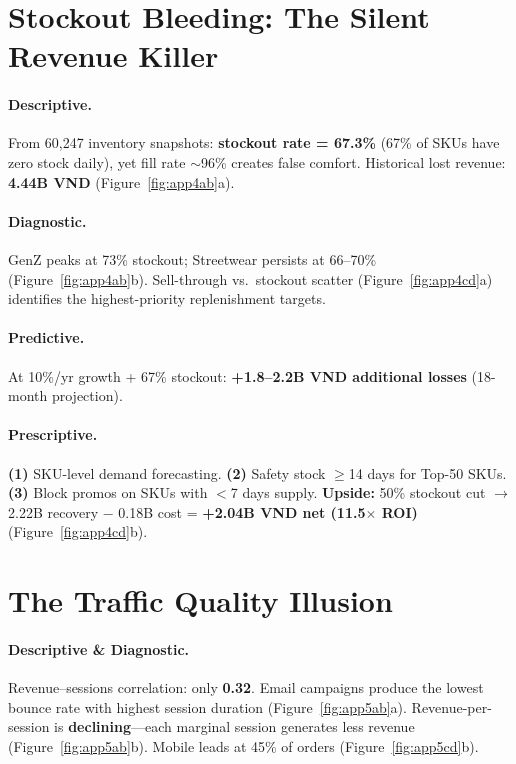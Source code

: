 \documentclass{article}
\begin{document}
\section{Stockout Bleeding: The Silent Revenue Killer}
\label{sec:stockout}

\paragraph{Descriptive.}
From 60{,}247 inventory snapshots: \textbf{stockout rate = 67.3\%} (67\% of SKUs have zero stock daily), yet fill rate $\sim$96\% creates false comfort. Historical lost revenue: \textbf{4.44B VND} (Figure~\ref{fig:app4ab}a).

\paragraph{Diagnostic.}
GenZ peaks at 73\% stockout; Streetwear persists at 66--70\% (Figure~\ref{fig:app4ab}b). Sell-through vs.\ stockout scatter (Figure~\ref{fig:app4cd}a) identifies the highest-priority replenishment targets.

\paragraph{Predictive.}
At 10\%/yr growth + 67\% stockout: \textbf{+1.8--2.2B VND additional losses} (18-month projection).

\paragraph{Prescriptive.}
\textbf{(1)} SKU-level demand forecasting. \textbf{(2)} Safety stock $\geq$14 days for Top-50 SKUs. \textbf{(3)} Block promos on SKUs with $<$7 days supply. \textbf{Upside:} 50\% stockout cut $\to$ 2.22B recovery $-$ 0.18B cost = \textbf{+2.04B VND net (11.5$\times$ ROI)} (Figure~\ref{fig:app4cd}b).

\section{The Traffic Quality Illusion}
\label{sec:traffic}

\paragraph{Descriptive \& Diagnostic.}
Revenue--sessions correlation: only \textbf{0.32}. Email campaigns produce the lowest bounce rate with highest session duration (Figure~\ref{fig:app5ab}a). Revenue-per-session is \textbf{declining}---each marginal session generates less revenue (Figure~\ref{fig:app5ab}b). Mobile leads at 45\% of orders (Figure~\ref{fig:app5cd}b).
\end{document}

